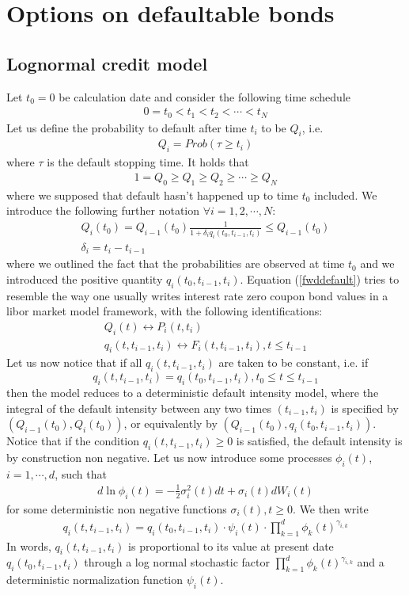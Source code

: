 \documentclass[a4paper,10pt]{report}
\theoremstyle{plain}
\theoremstyle{definition}
\newcommand\be{\begin{eqnarray}}    %
\newcommand\ee{\end{eqnarray}}
\begin{document}
\section{Options on defaultable bonds}

\subsection{Lognormal credit model}

Let $t_0=0$ be calculation date and consider the following time schedule
\be 
0=t_0<t_1<t_2<\cdots < t_N
\ee
Let us define the probability to default after time $t_i$ to be $Q_i$, i.e.
\be 
Q_i=Prob\left(\tau\ge t_i\right)
\ee
where $\tau$ is the default stopping time.
It holds that
\be 
1=Q_0\ge Q_1 \ge Q_2 \ge \cdots \ge Q_N
\ee
where we supposed that default hasn't happened up to time $t_0$ included.
We introduce the following further notation $\forall i=1,2,\cdots , N$:
\be 
\label{fwddefault}
Q_i(t_0) = Q_{i-1}(t_0)\frac{1}{1+\delta_i q_i(t_0,t_{i-1},t_i)}\le Q_{i-1}(t_0)\\
\delta_i = t_i - t_{i-1}
\ee
where we outlined the fact that the probabilities are observed at time $t_0$ and we introduced the positive quantity $q_i(t_0,t_{i-1},t_i)$.
Equation (\ref{fwddefault}) tries to resemble the way one usually writes interest rate zero coupon bond values in a libor market model framework, with the following identifications:
\be 
Q_i(t)\leftrightarrow P_i(t,t_i)\\
q_i(t,t_{i-1},t_i)\leftrightarrow F_i(t,t_{i-1},t_i), t\le t_{i-1}
\ee
Let us now notice that if all $q_i(t,t_{i-1},t_i)$ are taken to be constant, i.e. if 
\[
q_i(t,t_{i-1},t_i)=q_i(t_0,t_{i-1},t_i), t_0\le t \le t_{i-1}
\]
then the model reduces to a deterministic default intensity model, where the integral of the default intensity between any two times $(t_{i-1},t_i)$ is specified by $\left( Q_{i-1}(t_0), Q_i(t_0) \right)$, or equivalently by  $\left(Q_{i-1}(t_0), q_i(t_0,t_{i-1},t_i)\right)$.
Notice that if the condition $q_i(t,t_{i-1},t_i)\ge 0$ is satisfied, the default intensity is  by construction non negative.
Let us now introduce some processes $\phi_i(t)$, $i=1,\cdots, d$, such that 
\be 
\label{dphi}
d \ln \phi_i(t) = -\frac{1}{2} \sigma_i^2(t) dt + \sigma_i(t) dW_i(t)
\ee
for some deterministic non negative functions $ \sigma_i(t), t\ge 0$.
We then write
\be 
\label{qit}
q_i(t,t_{i-1},t_i) = q_i(t_0,t_{i-1},t_i)\cdot  \psi_i(t) \cdot \prod_{k=1}^d \phi_k(t)^{\gamma_{i,k}}
\ee
In words, $q_i(t,t_{i-1},t_i)$ is proportional to its value at present date $q_i(t_0,t_{i-1},t_i)$ through a log normal stochastic factor $\prod_{k=1}^d \phi_k(t)^{\gamma_{i,k}}$ and a deterministic normalization function $\psi_i(t)$. 
\end{document}
